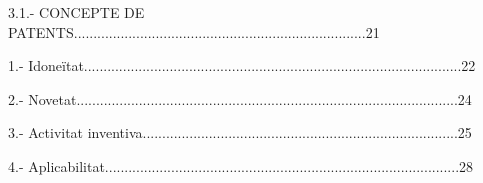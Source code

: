 \documentclass[12pt]{article}
\begin{document}
\vspace{\baselineskip}

\vspace{\baselineskip}
\begin{justify}
3.1.- CONCEPTE DE PATENTS...........................................................................21
\end{justify}\par


\vspace{\baselineskip}

\vspace{\baselineskip}
\begin{adjustwidth}{0.49in}{0.0in}
\begin{justify}
1.- Idoneïtat.................................................................................................22
\end{justify}\par

\end{adjustwidth}


\vspace{\baselineskip}
\begin{adjustwidth}{0.49in}{0.0in}
\begin{justify}
2.- Novetat..................................................................................................24
\end{justify}\par

\end{adjustwidth}


\vspace{\baselineskip}
\begin{adjustwidth}{0.49in}{0.0in}
\begin{justify}
3.- Activitat inventiva.................................................................................25
\end{justify}\par

\end{adjustwidth}


\vspace{\baselineskip}
\begin{adjustwidth}{0.49in}{0.0in}
\begin{justify}
4.- Aplicabilitat...........................................................................................28
\end{justify}\par

\end{adjustwidth}
\end{document}
